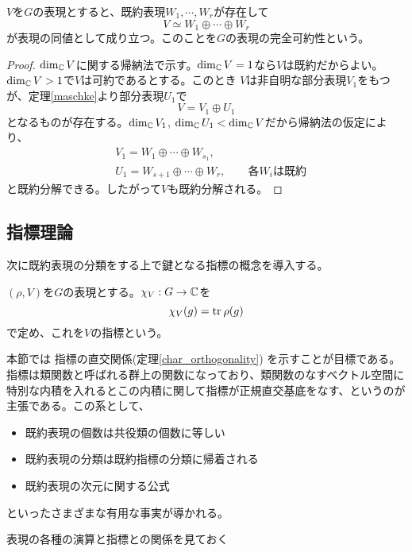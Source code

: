 \documentclass{ltjsreport}
\begin{document}
\begin{cor}\label{irr_decompose}
  $V$を$G$の表現とすると、既約表現$W_1,\cdots,W_r$が存在して
  \[
  V\simeq W_1\oplus\cdots\oplus W_r  
  \]
  が表現の同値として成り立つ。このことを$G$の表現の完全可約性という。
\end{cor}

\begin{proof}
  $\dim_{\mathbb{C}} V$に関する帰納法で示す。$\dim_{\mathbb{C}} V=1$なら$V$は既約だからよい。$\dim_{\mathbb{C}} V>1$で$V$は可約であるとする。このとき
  $V$は非自明な部分表現$V_1$をもつが、定理\ref{maschke}より部分表現$U_1$で
  \[
  V=V_1\oplus U_1  
  \]
  となるものが存在する。$\dim_{\mathbb{C}} V_1$, $\dim_{\mathbb{C}} U_1<\dim_{\mathbb{C}} V$だから帰納法の仮定により、
  \begin{align*}
    &V_1=W_1\oplus\cdots\oplus W_{s_1},\\
    &U_1=W_{s+1}\oplus\cdots\oplus W_{r},\qquad\text{各$W_i$は既約}
  \end{align*}
  と既約分解できる。したがって$V$も既約分解される。
\end{proof}





\subsection{指標理論}

次に既約表現の分類をする上で鍵となる指標の概念を導入する。

\begin{defin}
  $(\rho,V)$を$G$の表現とする。$\chi_V:G\rightarrow\mathbb{C}$を
  \[
  \chi_V(g)=\text{tr}\: \rho(g)
  \]
  で定め、これを$V$の指標という。
\end{defin}

本節では
指標の直交関係(定理\ref{char_orthogonality})
を示すことが目標である。指標は類関数と呼ばれる群上の関数になっており、類関数のなすベクトル空間に特別な内積を入れるとこの内積に関して指標が正規直交基底をなす、というのが主張である。この系として、
\begin{itemize}
  \item 既約表現の個数は共役類の個数に等しい
  \item 既約表現の分類は既約指標の分類に帰着される
  \item 既約表現の次元に関する公式
\end{itemize}
といったさまざまな有用な事実が導かれる。

表現の各種の演算と指標との関係を見ておく
\end{document}
